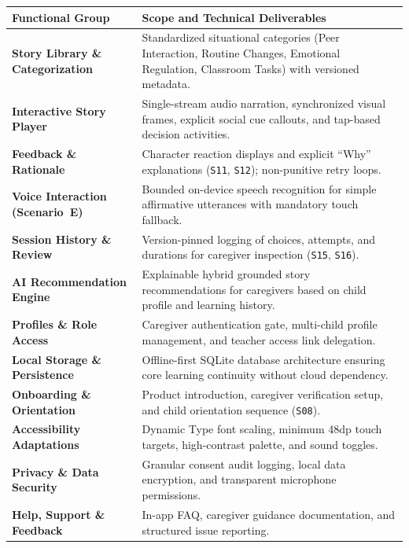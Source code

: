 \begin{xltabular}{\textwidth}{|p{4.2cm}|X|}
\hline
\textbf{Functional Group} & \textbf{Scope and Technical Deliverables} \\ \hline
\endhead
\textbf{Story Library \& Categorization} & Standardized situational categories (Peer Interaction, Routine Changes, Emotional Regulation, Classroom Tasks) with versioned metadata. \\ \hline
\textbf{Interactive Story Player} & Single-stream audio narration, synchronized visual frames, explicit social cue callouts, and tap-based decision activities. \\ \hline
\textbf{Feedback \& Rationale} & Character reaction displays and explicit ``Why'' explanations (\texttt{S11}, \texttt{S12}); non-punitive retry loops. \\ \hline
\textbf{Voice Interaction (Scenario~E)} & Bounded on-device speech recognition for simple affirmative utterances with mandatory touch fallback. \\ \hline
\textbf{Session History \& Review} & Version-pinned logging of choices, attempts, and durations for caregiver inspection (\texttt{S15}, \texttt{S16}). \\ \hline
\textbf{AI Recommendation Engine} & Explainable hybrid grounded story recommendations for caregivers based on child profile and learning history. \\ \hline
\textbf{Profiles \& Role Access} & Caregiver authentication gate, multi-child profile management, and teacher access link delegation. \\ \hline
\textbf{Local Storage \& Persistence} & Offline-first SQLite database architecture ensuring core learning continuity without cloud dependency. \\ \hline
\textbf{Onboarding \& Orientation} & Product introduction, caregiver verification setup, and child orientation sequence (\texttt{S08}). \\ \hline
\textbf{Accessibility Adaptations} & Dynamic Type font scaling, minimum 48dp touch targets, high-contrast palette, and sound toggles. \\ \hline
\textbf{Privacy \& Data Security} & Granular consent audit logging, local data encryption, and transparent microphone permissions. \\ \hline
\textbf{Help, Support \& Feedback} & In-app FAQ, caregiver guidance documentation, and structured issue reporting. \\ \hline
\end{xltabular}
\label{tab:c1_functional_scope}

